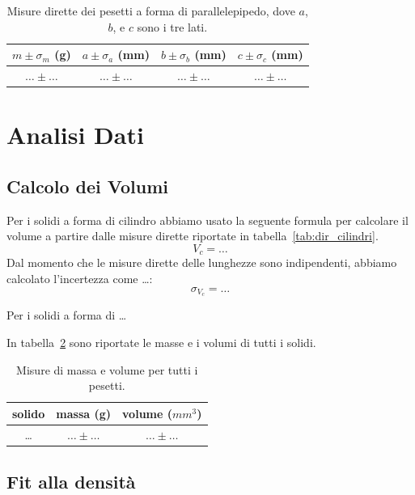 \documentclass[a4paper]{article}
\begin{document}
\begin{table}[]
    \centering
    \begin{tabular}{c|c|c|c}
      $m\pm \sigma_m$ (g)   & $a\pm\sigma_a$ (mm)  & $b\pm\sigma_b$ (mm)& $c\pm\sigma_c$ (mm)\\
      \hline
       $\ldots \pm \ldots$  & $\ldots \pm \ldots$ & $\ldots \pm \ldots$ & $\ldots \pm \ldots$\\
    \end{tabular}
    \caption{Misure dirette dei pesetti a forma di parallelepipedo, dove $a$, $b$, e $c$ sono i tre lati.}
    \label{tab:dir_parallelepipedi}
\end{table}


\section{Analisi Dati}
\subsection{Calcolo dei Volumi}
Per i solidi a forma di cilindro abbiamo usato la seguente formula per calcolare il volume a partire dalle misure dirette riportate in tabella~\ref{tab:dir_cilindri}.
\begin{equation}
    V_c = \ldots
\end{equation}
Dal momento che le misure dirette delle lunghezze sono indipendenti, abbiamo calcolato l'incertezza come \ldots:
\begin{equation}
    \sigma_{V_c} = \ldots
\end{equation}

Per i solidi a forma di \ldots

In tabella~\ref{tab:m_V} sono riportate le masse e i volumi di tutti i solidi.

\begin{table}[]
    \centering
    \begin{tabular}{c|c|c}
      solido   & massa (g)  & volume ($mm^3$)\\
      \hline
       \ldots & $\ldots \pm \ldots$ & $\ldots \pm \ldots$\\
    \end{tabular}
    \caption{Misure di massa e volume per tutti i pesetti.}
    \label{tab:m_V}
\end{table}

\subsection{Fit alla densit\`a}
\end{document}
